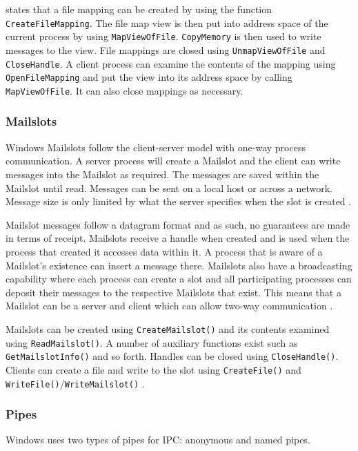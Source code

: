 \documentclass[12pt,a4paper,oneside]{article}
\def\code#1{\texttt{#1}}
\begin{document}
\begin{spacing}{1.4}
\cite{IPCWindowsLinkedInSlides} states that a file mapping can be created by using the function \code{CreateFileMapping}. The file map view is then put into address space of the current process by using \code{MapViewOfFile}. \code{CopyMemory} is then used to write messages to the view. File mappings are closed using \code{UnmapViewOfFile} and \code{CloseHandle}. A client process can examine the contents of the mapping using \code{OpenFileMapping} and put the view into its address space by calling \code{MapViewOfFile}. It can also close mappings as necessary.

\subsubsection{Mailslots}
Windows Mailslots follow the client-server model with one-way process communication. A server process will create a Mailslot and the client can write messages into the Mailslot as required. The messages are saved within the Mailslot until read. Messages can be sent on a local host or across a network. Message size is only limited by what the server specifies when the slot is created \citep{MSDN_API}. 

Mailslot messages follow a datagram format and as such, no guarantees are made in terms of receipt. Mailslots receive a handle when created and is used when the process that created it accesses data within it. A process that is aware of a Mailslot's existence can insert a message there. Mailslots also have a broadcasting capability where each process can create a slot and all participating processes can deposit their messages to the respective Mailslots that exist. This means that a Mailslot can be a server and client which can allow two-way communication \citep{MSDN_API}.

Mailslots can be created using \code{CreateMailslot()} and its contents examined using \code{ReadMailslot()}. A number of auxiliary functions exist such as \code{GetMailslotInfo()} and so forth. Handles can be closed using \code{CloseHandle()}. Clients can create a file and write to the slot using \code{CreateFile()} and \code{WriteFile()}/\code{WriteMailslot()} \citep{IPCWindowsLinkedInSlides}.

\subsubsection{Pipes}
Windows uses two types of pipes for IPC: anonymous and named pipes.


\end{spacing}
\end{document}
